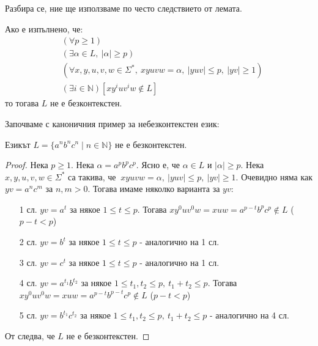 Разбира се, ние ще използваме по често следствието от лемата.

\begin{corollary}
    Ако е изпълнено, че:
    \begin{align*}
         & (\forall p \geq 1)                                                                       \\
         & (\exists \alpha \in L, \: |\alpha| \geq p)                                               \\
         & (\forall x, y, u, v, w \in \Sigma^*, \: xyuvw = \alpha, \: |yuv| \leq p, \: |yv| \geq 1) \\
         & (\exists i \in \mathbb{N}) [xy^iuv^iw \notin L]
    \end{align*}
    то тогава $L$ не е безконтекстен.
\end{corollary}

Започваме с каноничния пример за небезконтекстен език:
\begin{claim}
    Езикът $L = \{ a^nb^nc^n \mid n \in \mathbb{N} \}$ не е безконтекстен.
\end{claim}

\begin{proof}
    Нека $p \geq 1$.
    Нека $\alpha = a^pb^pc^p$.
    Ясно е, че $\alpha \in L$ и $|\alpha| \geq p$.
    Нека $x, y, u, v, w \in \Sigma^*$ са такива, че $\: xyuvw = \alpha, \: |yuv| \leq p, \: |yv| \geq 1$.
    Очевидно няма как $yv = a^nc^m$ за $n, m > 0$.
    Тогава имаме няколко варианта за $yv$:
    \begin{itemize}
        \item[1 сл.] $yv = a^t$ за някое $1 \leq t \leq p$.
            Тогава $xy^0uv^0w = xuw = a^{p - t}b^pc^p \notin L$ ($p - t < p$)
        \item[2 сл.] $yv = b^t$ за някое $1 \leq t \leq p$ - аналогично на 1 сл.
        \item[3 сл.] $yv = c^t$ за някое $1 \leq t \leq p$ - аналогично на 1 сл.
        \item[4 сл.] $yv = a^{t_1}b^{t_2}$ за някое $1 \leq t_1, t_2 \leq p, \: t_1 + t_2 \leq p$.
            Тогава $xy^0uv^0w = xuw = a^{p - t}b^{p - t}c^p \notin L$ ($p - t < p$)
        \item[5 сл.] $yv = b^{t_1}c^{t_2}$ за някое $1 \leq t_1, t_2 \leq p, \: t_1 + t_2 \leq p$ - аналогично на 4 сл.
    \end{itemize}
    От  следва, че $L$ не е безконтекстен.
\end{proof}

